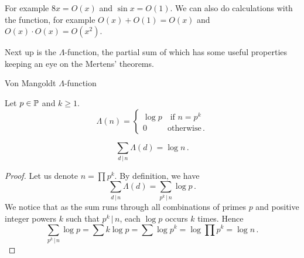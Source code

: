 \documentclass{article}
\begin{document}
For example $8x=O(x)$ and $\sin{x}=O(1)$. We can also do calculations with the function, for example $O(x)+O(1)=O(x)$ and $O(x)\cdot O(x) = O(x^2)$.

Next up is the $\Lambda$-function, the partial sum of which has some useful properties keeping an eye on the Mertens' theorems.

\begin{definition}
Von Mangoldt $\Lambda$-function

Let $p\in\mathbb{P}$ and $k\geq1$.
\begin{equation*}
    \Lambda(n) =
    \begin{cases}
    \log p \quad \text{if } n=p^k\\
    0 \quad\quad\,\,\, \text{otherwise}\,.
    \end{cases}
\end{equation*}
\end{definition}

\begin{theorem}
\label{thm:lambdaf}
\begin{equation*}
    \sum_{d\,\vert\, n} \Lambda(d) = \log n\,.
\end{equation*}
\begin{proof}
Let us denote $n=\prod p^k$. By definition, we have
\begin{equation*}
    \sum_{d\,\vert\, n} \Lambda(d) = \sum_{p^k\,\vert\, n} \log p\,.
\end{equation*}
We notice that as the sum runs through all combinations of primes $p$ and positive integer powers $k$ such that $p^k\,\vert\, n$, each $\log p$ occurs $k$ times. Hence
\begin{equation*}
    \sum_{p^k\,\vert\, n} \log p = \sum k \log p = \sum \log p^k = \log \prod p^k = \log n\,.
\end{equation*}
\end{proof}
\end{theorem}
\end{document}
